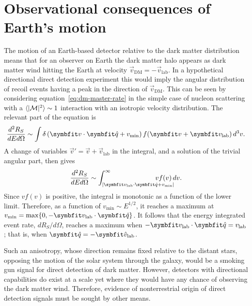 \section{Observational consequences of Earth's motion}

The motion of an Earth-based detector relative to the dark matter distribution means that for an observer on Earth the dark matter halo appears as dark matter wind hitting the Earth at velocity $\vec{v}_\text{DM}=-\vec{v}_\text{lab}$. In a hypothetical directional direct detection experiment this would imply the angular distribution of recoil events having a peak in the direction of $\vec{v}_\text{DM}$. This can be seen by considering equation~\eqref{eq:dm-master-rate} in the simple case of nucleon scattering with a $\langle|\mathcal{M}|^2\rangle\sim 1$ interaction with an isotropic velocity distribution. The relevant part of the equation is
\begin{equation}
    \ddder{R_S}{E}{\Omega}\sim\int\delta\left(\vec{v}\cdot\unitv{q}+v_\text{min}\right)f(\vec{v}+\vec{v}_\text{lab})\difd^3v.
\end{equation}
A change of variables $\vec{v}'=\vec{v}+\vec{v}_\text{lab}$ in the integral, and a solution of the trivial angular part, then gives
\begin{equation}
    \ddder{R_S}{E}{\Omega}\sim\int_{|\vec{v}_\text{lab}\cdot\unitv{q}+v_\text{min}|}^\infty\hspace{-3em}vf(v)\difd v.
    \label{eq:isotropic-rate}
\end{equation}
Since $vf(v)$ is positive, the integral is monotonic as a function of the lower limit. Therefore, as a function of $v_\text{min}\sim E^{1/2}$, it reaches a maximum at $v_\text{min}=\max\{0,-\vec{v}_\text{lab}\cdot\unitv{q}\}$. It follows that the energy integrated event rate, $dR_S/d\Omega$, reaches a maximum when $-\vec{v}_\text{lab}\cdot\unitv{q}=v_\text{lab}$; that is, when $\unitv{q}=-\unitv{v}_\text{lab}$.

Such an anisotropy, whose direction remains fixed relative to the distant stars, opposing the motion of the solar system through the galaxy, would be a smoking gun signal for direct detection of dark matter. However, detectors with directional capabilities do exist at a scale yet where they would have any chance of observing the dark matter wind. Therefore, evidence of nonterrestrial origin of direct detection signals must be sought by other means.

